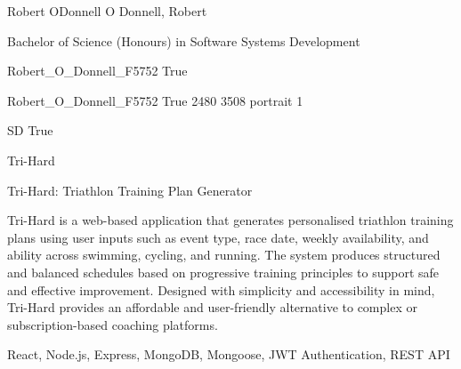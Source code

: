 \documentclass[twoside]{report}
\begin{document}
\begingroup{}\relax



\def\Key{Robert_O_Donnell_F5752}

{Robert ODonnell}
{O Donnell, Robert}

{Bachelor of Science (Honours) in Software Systems Development}

{Robert_O_Donnell_F5752}
{True}

{Robert_O_Donnell_F5752}
{True}
{2480}
{3508}
{portrait}
{1}

{SD}
{True}

{Tri-Hard}

{Tri-Hard: Triathlon Training Plan Generator}

{Tri-Hard is a web-based application that generates personalised triathlon training plans using user inputs such as event type, race date, weekly availability, and ability across swimming, cycling, and running. The system produces structured and balanced schedules based on progressive training principles to support safe and effective improvement. Designed with simplicity and accessibility in mind, Tri-Hard provides an affordable and user-friendly alternative to complex or subscription-based coaching platforms.}

{React, Node.js, Express, MongoDB, Mongoose, JWT Authentication, REST API}
\end{document}
